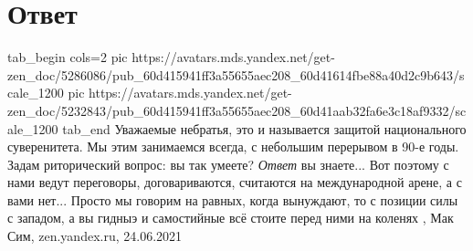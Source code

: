  
 
 
 
 
\chapter{Ответ}
\label{sec:slova.otvet}

\ifcmt
tab_begin cols=2
	pic https://avatars.mds.yandex.net/get-zen_doc/5286086/pub_60d415941ff3a55655aec208_60d41614fbe88a40d2c9b643/scale_1200
  pic https://avatars.mds.yandex.net/get-zen_doc/5232843/pub_60d415941ff3a55655aec208_60d41aab32fa6e3c18af9332/scale_1200
tab_end
\fi
Уважаемые небратья, это и называется защитой национального суверенитета. Мы
этим занимаемся всегда, с небольшим перерывом в 90-е годы. Задам риторический
вопрос: вы так умеете? \emph{Ответ} вы знаете...  Вот поэтому с нами ведут переговоры,
договариваются, считаются на международной арене, а с вами нет... Просто мы
говорим на равных, когда вынуждают, то с позиции силы с западом, а вы гидныэ и
самостийные всё стоите перед ними на коленях
, 
Мак Сим, zen.yandex.ru, 24.06.2021
